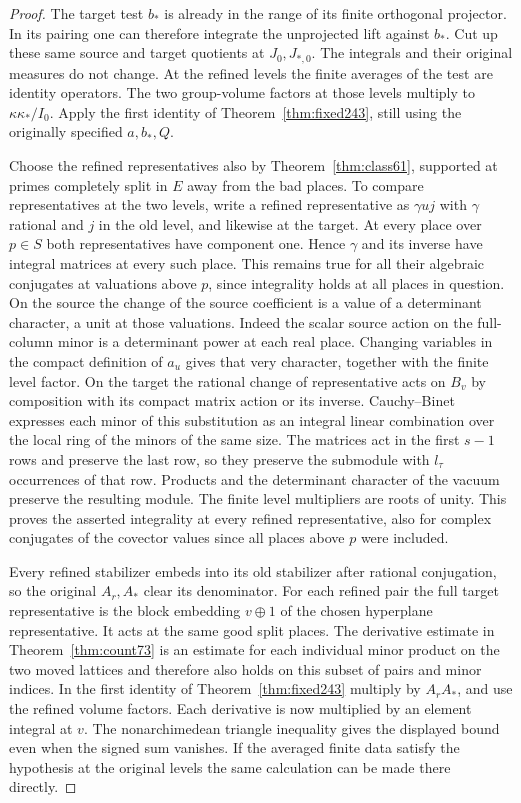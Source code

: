 \documentclass[a4paper,11pt]{article}
\theoremstyle{definition}
\theoremstyle{remark}
\numberwithin{equation}{section}
\begin{document}
\begin{proof}
The target test \(b_*\) is already in the range of its finite
orthogonal projector. In its pairing one can therefore integrate
the unprojected lift against \(b_*\). Cut up these same source and
target quotients at \(J_0,J_{*,0}\). The integrals and their
original measures do not change. At the refined levels the finite
averages of the test are identity operators. The two group-volume
factors at those levels multiply to \(\kappa\kappa_*/I_0\).
Apply the first identity of Theorem~\ref{thm:fixed243},
still using the originally specified \(a,b_*,Q\).

Choose the refined representatives also by
Theorem~\ref{thm:class61}, supported at primes completely split
in \(E\) away from the bad places. To compare representatives
at the two levels, write a refined representative as
\(\gamma u j\) with \(\gamma\) rational and \(j\) in the old
level, and likewise at the target. At every place over \(p\in S\)
both representatives have component one. Hence \(\gamma\) and
its inverse have integral matrices at every such place. This
remains true for all their algebraic conjugates at valuations
above \(p\), since integrality holds at all places in question.
On the source the change of the source coefficient is a
value of a determinant character, a unit at those valuations.
Indeed the scalar source action on the full-column minor is a
determinant power at each real place. Changing variables in the
compact definition of \(a_u\) gives that very character, together
with the finite level factor. On the target the rational change
of representative acts on \(B_v\) by composition with its
compact matrix action or its inverse. Cauchy--Binet expresses
each minor of this substitution as an integral linear combination
over the local ring of the minors of the same size. The matrices
act in the first \(s-1\) rows and preserve the last row, so they
preserve the submodule with \(l_\tau\) occurrences of that row.
Products and the determinant character of the vacuum preserve
the resulting module. The finite level multipliers are roots
of unity. This proves the asserted integrality at every refined
representative, also for complex conjugates of the covector
values since all places above \(p\) were included.

Every refined stabilizer embeds into its old stabilizer after
rational conjugation, so the original \(A_r,A_*\) clear its
denominator. For each refined pair the full target representative
is the block embedding \(v\oplus1\) of the chosen hyperplane
representative. It acts at the same good split places. The
derivative estimate in Theorem~\ref{thm:count73} is an estimate
for each individual minor product on the two moved lattices and
therefore also holds on this subset of pairs and minor indices.
In the first identity of Theorem~\ref{thm:fixed243} multiply by
\(A_rA_*\), and use the refined volume factors. Each derivative
is now multiplied by an element integral at \(v\). The
nonarchimedean triangle inequality gives the displayed bound
even when the signed sum vanishes. If the averaged finite data
satisfy the hypothesis at the original levels the same calculation
can be made there directly.


\end{proof}
\end{document}
